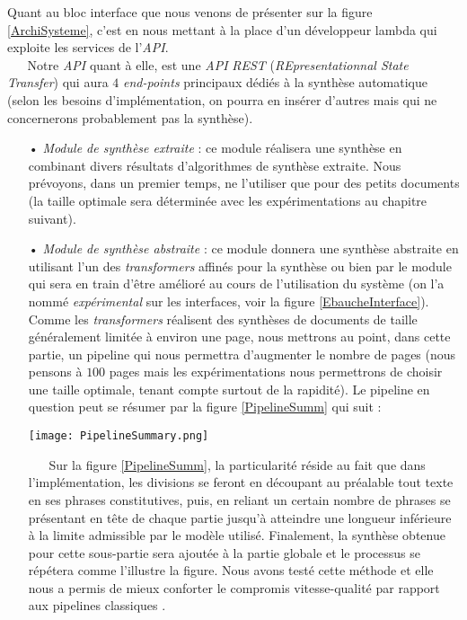Quant au bloc interface que nous venons de présenter sur la figure \ref{ArchiSysteme}, c'est en nous mettant à la place d'un développeur lambda qui exploite les services de l'\textit{API}.\\
$ _{} $ $ _{} $ $ _{} $ $ _{} $ $ _{} $Notre \textit{API} quant à elle, est une \textit{API} \textit{REST} (\textit{REpresentationnal State Transfer}) qui aura $ 4 $ \textit{end-points} principaux dédiés à la synthèse automatique (selon les besoins d'imp\-lé\-men\-ta\-tion, on pourra en insérer d'autres mais qui ne concernerons probablement pas la synthèse).
\begin{itemize}
\item[•] \textit{Module de synthèse extraite} : ce module réalisera une synthèse en combinant divers résultats d'algorithmes de synthèse extraite. Nous prévoyons, dans un premier temps, ne l'utiliser que pour des petits documents (la taille optimale sera déterminée avec les expérimentations au chapitre suivant).
\item[•] \textit{Module de synthèse abstraite} : ce module donnera une synthèse abstraite en utilisant l'un des \textit{transformers} affinés pour la synthèse ou bien par le module qui sera en train d'être amélioré au cours de l'utilisation du système (on l'a nommé \textit{expérimental} sur les interfaces, voir la figure \ref{EbaucheInterface}). Comme les \textit{transformers} réalisent des synthèses de documents de taille généralement limitée à environ une page, nous mettrons au point, dans cette partie, un pipeline qui nous permettra d'augmenter le nombre de pages (nous pensons à $ 100 $ pages mais les expérimentations nous permettrons de choisir une taille optimale, tenant compte surtout de la rapidité). Le pipeline en question peut se résumer par la figure \ref{PipelineSumm} qui suit :
\begin{center}
\texttt{[image: PipelineSummary.png]}
\label{PipelineSumm}
\end{center}
$ _{} $ $ _{} $ $ _{} $ $ _{} $ $ _{} $Sur la figure \ref{PipelineSumm}, la particularité réside au fait que dans l'implémentation, les divisions se feront en découpant au préalable tout texte en ses phrases constitutives, puis, en reliant un certain nombre de phrases se présentant en tête de chaque partie jusqu'à atteindre une longueur inférieure à la limite admissible par le modèle utilisé. Finalement, la synthèse obtenue pour cette sous-partie sera ajoutée à la partie globale et le processus se répétera comme l'illustre la figure. Nous avons testé cette méthode et elle nous a permis de mieux conforter le compromis vitesse-qualité par rapport aux pipelines classiques \cite{GRAAL_HF_tunstall2022natural}.

\end{itemize}
